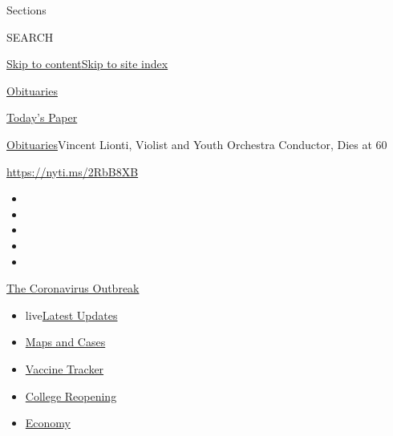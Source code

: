 Sections

SEARCH

\protect\hyperlink{site-content}{Skip to
content}\protect\hyperlink{site-index}{Skip to site index}

\href{https://www.nytimes.com/section/obituaries}{Obituaries}

\href{https://myaccount.nytimes.com/auth/login?response_type=cookie\&client_id=vi}{}

\href{https://www.nytimes.com/section/todayspaper}{Today's Paper}

\href{/section/obituaries}{Obituaries}\textbar{}Vincent Lionti, Violist
and Youth Orchestra Conductor, Dies at 60

\url{https://nyti.ms/2RbB8XB}

\begin{itemize}
\item
\item
\item
\item
\item
\end{itemize}

\href{https://www.nytimes.com/news-event/coronavirus?action=click\&pgtype=Article\&state=default\&region=TOP_BANNER\&context=storylines_menu}{The
Coronavirus Outbreak}

\begin{itemize}
\tightlist
\item
  live\href{https://www.nytimes.com/2020/08/03/world/coronavirus-covid-19.html?action=click\&pgtype=Article\&state=default\&region=TOP_BANNER\&context=storylines_menu}{Latest
  Updates}
\item
  \href{https://www.nytimes.com/interactive/2020/us/coronavirus-us-cases.html?action=click\&pgtype=Article\&state=default\&region=TOP_BANNER\&context=storylines_menu}{Maps
  and Cases}
\item
  \href{https://www.nytimes.com/interactive/2020/science/coronavirus-vaccine-tracker.html?action=click\&pgtype=Article\&state=default\&region=TOP_BANNER\&context=storylines_menu}{Vaccine
  Tracker}
\item
  \href{https://www.nytimes.com/2020/08/02/us/covid-college-reopening.html?action=click\&pgtype=Article\&state=default\&region=TOP_BANNER\&context=storylines_menu}{College
  Reopening}
\item
  \href{https://www.nytimes.com/live/2020/08/03/business/stock-market-today-coronavirus?action=click\&pgtype=Article\&state=default\&region=TOP_BANNER\&context=storylines_menu}{Economy}
\end{itemize}

